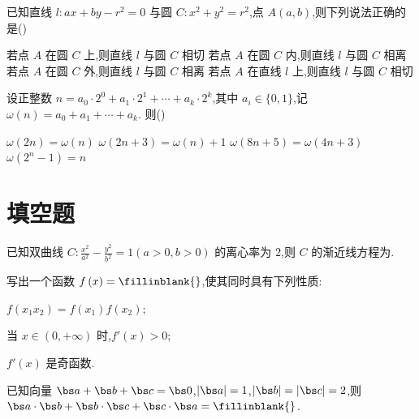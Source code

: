 \begin{problem}
已知直线 \(l:ax+by-r^2=0\) 与圆 \(C:x^2+y^2=r^2\),点 \(A\left( a,b \right)\),则下列说法正确的是(\quad)

\choices
    {若点 \(A\) 在圆 \(C\) 上,则直线 \(l\) 与圆 \(C\) 相切}
    {若点 \(A\) 在圆 \(C\) 内,则直线 \(l\) 与圆 \(C\) 相离}
    {若点 \(A\) 在圆 \(C\) 外,则直线 \(l\) 与圆 \(C\) 相离}
    {若点 \(A\) 在直线 \(l\) 上,则直线 \(l\) 与圆 \(C\) 相切}

\end{problem}


\begin{problem}
设正整数 \(n=a_0\cdot 2^0+a_1\cdot 2^1+\cdots +a_k\cdot 2^k\),其中 \(a_i\in \{0,1\}\),记 \(\omega\left( n \right)=a_0+a_1+\cdots +a_k\). 则(\quad)

\choices
    {\(\omega\left( 2n \right)=\omega\left( n \right)\)}
    {\(\omega\left( 2n+3 \right)=\omega\left( n \right)+1\)}
    {\(\omega\left( 8n+5 \right)=\omega\left( 4n+3 \right)\)}
    {\(\omega\left( 2^n-1 \right)=n\)}

\end{problem}

\section{填空题}

\begin{problem}
已知双曲线 \(C:\frac{x^2}{a^2}-\frac{y^2}{b^2}=1\left( a>0,b>0 \right)\) 的离心率为 \(2\),则 \(C\) 的渐近线方程为\fillinblank{}.

\end{problem}


\begin{problem}
写出一个函数 \(f\left( x \right)=\fillinblank{}\),使其同时具有下列性质:

\begin{circlelist}
\item \(f\left( x_1x_2 \right)=f\left( x_1 \right)f\left( x_2 \right)\);
\item 当 \(x\in \left( 0,+\infty \right)\) 时,\(f'\left( x \right)>0\);
\item \(f'\left( x \right)\) 是奇函数.
\end{circlelist}

\end{problem}


\begin{problem}
已知向量 \(\bs a+\bs b+\bs c=\bs 0\),\(\left| \bs a \right|=1\),\(\left| \bs b \right|=\left| \bs c \right|=2\),则 \(\bs a\cdot \bs b+\bs b\cdot \bs c+\bs c\cdot \bs a=\fillinblank{}\).

\end{problem}


